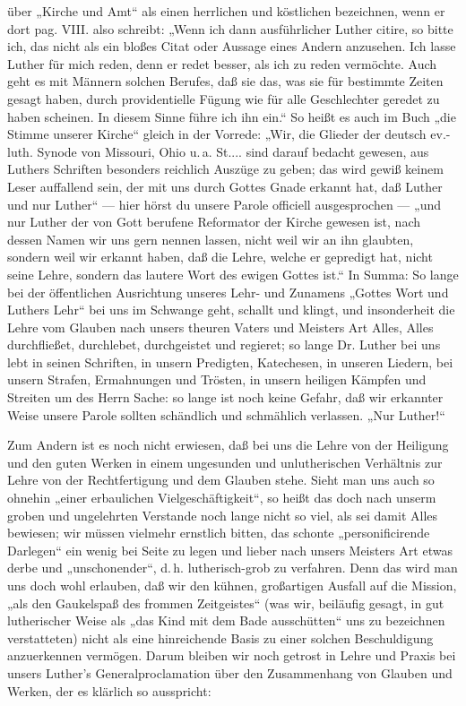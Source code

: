 über „Kirche und Amt“ als einen herrlichen und köstlichen bezeichnen, wenn er dort pag. VIII. also schreibt:
„Wenn ich dann ausführlicher Luther citire, so bitte ich, das nicht als ein bloßes Citat oder Aussage eines
Andern anzusehen. Ich lasse Luther für mich reden, denn er redet besser, als ich zu reden vermöchte. Auch geht
es mit Männern solchen Berufes, daß sie das, was sie für bestimmte Zeiten gesagt haben, durch providentielle
Fügung wie für alle Geschlechter geredet zu haben scheinen. In diesem Sinne führe ich ihn ein.“ So heißt es
auch im Buch „die Stimme unserer Kirche“ gleich in der Vorrede: „Wir, die Glieder der deutsch ev.-luth. Synode
von Missouri, Ohio u.\,a. St.... sind darauf bedacht gewesen, aus Luthers Schriften besonders reichlich Auszüge zu
geben; das wird gewiß keinem Leser auffallend sein, der mit uns durch Gottes Gnade erkannt hat, daß Luther und
nur Luther“ — hier hörst du unsere Parole officiell ausgesprochen — „und nur Luther der von Gott berufene
Reformator der Kirche gewesen ist, nach dessen Namen wir uns gern nennen lassen, nicht weil wir an ihn glaubten,
sondern weil wir erkannt haben, daß die Lehre, welche er gepredigt hat, nicht seine Lehre, sondern das lautere Wort
des ewigen Gottes ist.“ In Summa: So lange bei der öffentlichen Ausrichtung unseres Lehr- und Zunamens „Gottes
Wort und Luthers Lehr“ bei uns im Schwange geht, schallt und klingt, und insonderheit die Lehre vom Glauben
nach unsers theuren Vaters und Meisters Art Alles, Alles durchfließet, durchlebet, durchgeistet und regieret; so
lange Dr. Luther bei uns lebt in seinen Schriften, in unsern Predigten, Katechesen, in unseren Liedern, bei unsern
Strafen, Ermahnungen und Trösten, in unsern heiligen Kämpfen und Streiten um des Herrn Sache: so lange ist noch
keine Gefahr, daß wir erkannter Weise unsere Parole sollten schändlich und schmählich verlassen. „Nur Luther!“

Zum Andern ist es noch nicht erwiesen, daß bei uns die Lehre von der Heiligung und den guten Werken in einem
ungesunden und unlutherischen Verhältnis zur Lehre von der Rechtfertigung und dem Glauben stehe. Sieht man uns
auch so ohnehin „einer erbaulichen Vielgeschäftigkeit“, so heißt das doch nach unserm groben und ungelehrten
Verstande noch lange nicht so viel, als sei damit Alles bewiesen; wir müssen vielmehr ernstlich bitten, das
schonte „personificirende Darlegen“ ein wenig bei Seite zu legen und lieber
nach unsers Meisters Art etwas derbe und „unschonender“, d.\,h. lutherisch-grob zu verfahren. Denn das wird
man uns doch wohl erlauben, daß wir den kühnen, großartigen Ausfall auf die Mission, „als den Gaukelspaß
des frommen Zeitgeistes“ (was wir, beiläufig gesagt, in gut lutherischer Weise als „das Kind mit dem Bade
ausschütten“ uns zu bezeichnen verstatteten) nicht als eine hinreichende Basis zu einer solchen Beschuldigung
anzuerkennen vermögen. Darum bleiben wir noch getrost in Lehre und Praxis bei unsers Luther’s Generalproclamation
über den Zusammenhang von Glauben und Werken, der es klärlich so ausspricht:

